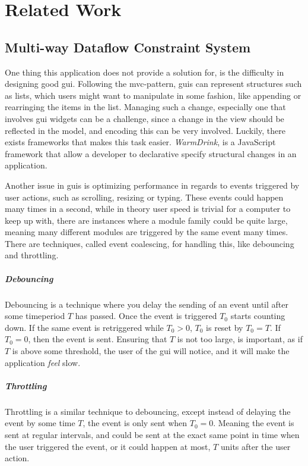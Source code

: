 \chapter{Related Work} \label{cha:related}

\section{Multi-way Dataflow Constraint System} \label{sec:mdcs}

One thing this application does not provide a solution for, is the difficulty
in designing good \gls{gui}. Following the \gls{mvc}-pattern, \gls{gui}s can
represent structures such as lists, which users might want to manipulate in
some fashion, like appending or rearringing the items in the list. Managing such
a change, especially one that involves \gls{gui} widgets can be a challenge,
since a change in the view should be reflected in the model, and encoding this
can be very involved. Luckily, there exists frameworks that makes this task
easier. \textit{WarmDrink}, \cite{warmDrink} \cite{dslMdcs} is a JavaScript
framework that allow a developer to declarative specify structural changes in
an application. 

Another issue in \gls{gui}s is optimizing performance in regards to events
triggered by user actions, such as scrolling, resizing or typing. These events
could happen many times in a second, while in theory user speed is trivial for a
computer to keep up with, there are instances where a module family could be
quite large, meaning many different modules are triggered by the same event many
times. There are techniques, called event coalescing, for handling this, like
debouncing and throttling.

\paragraph{Debouncing} Debouncing is a technique where you delay the sending of
an event until after some timeperiod $T$ has passed. Once the event is triggered
$T_0$ starts counting down. If the same event is retriggered while $T_0 > 0$,
$T_0$ is reset by $T_0 = T$. If $T_0 = 0$, then the event is sent. Ensuring that
$T$ is not too large, is important, as if $T$ is above some threshold, the user
of the \gls{gui} will notice, and it will make the application \textit{feel}
slow.

\paragraph{Throttling} Throttling is a similar technique to debouncing, except
instead of delaying the event by some time $T$, the event is only sent when
$T_0 = 0$. Meaning the event is sent at regular intervals, and could be sent at
the exact same point in time when the user triggered the event, or it could
happen at most, $T$ units after the user action.

